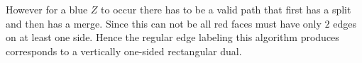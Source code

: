   However for a blue $Z$ to occur there has to be a valid path that first has a split and then has a merge. Since this can not be all red faces must have only $2$ edges on at least one side. Hence the regular edge labeling this algorithm produces corresponds to a vertically one-sided rectangular dual.


